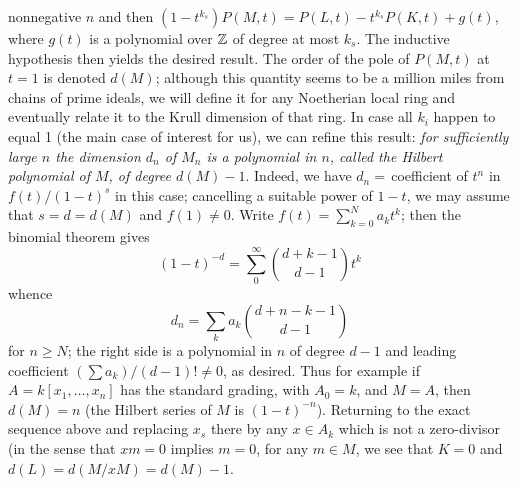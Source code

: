 \documentclass[10pt]{article}
\begin{document}
nonnegative $n$ and then $(1-t^{k_s})P(M,t) = P(L,t) - t^{k_s}P(K,t) +
g(t)$, where $g(t)$ is a polynomial over $\Bbb Z$ of degree at most
$k_s$. The inductive hypothesis then yields the desired result. The
order of the pole of $P(M,t)$ at $t=1$ is denoted $d(M)$; although this
quantity seems to be a million miles from chains of prime ideals, we
will define it for any Noetherian local ring and eventually relate it to
the Krull dimension of that ring. In case all $k_i$ happen to equal 1
(the main case of interest for us), we can refine this result: {\sl for
  sufficiently large $n$ the dimension $d_n$ of $M_n$ is a polynomial in
  $n$, called the Hilbert polynomial of $M$, of degree $d(M) - 1$}.
Indeed, we have $d_n =\,$coefficient of $t^n$ in $f(t)/(1-t)^s$ in this
case; cancelling a suitable power of $1-t$, we may assume that $s = d =
d(M)$ and $f(1)\ne0$. Write $f(t) = \sum_{k=0}^N a_k t^k$; then the
binomial theorem gives
$$(1-t)^{-d} = \sum_0^\infty {d+k-1\choose d-1} t^k$$
whence
$$ d_n = \sum_k a_k {d+n-k-1\choose d-1}$$
\noindent for $n\ge N$; the right side is a polynomial in $n$ of degree
$d-1$ and leading coefficient $(\sum a_k)/(d-1)!\ne0$, as desired. Thus
for example if $A=k[x_1,\ldots,x_n]$ has the standard grading, with $A_0
= k$, and $M=A$, then $d(M) = n$ (the Hilbert series of $M$ is
$(1-t)^{-n}$). Returning to the exact sequence above and replacing $x_s$
there by any $x\in A_k$ which is not a zero-divisor (in the sense that
$xm = 0$ implies $m=0$, for any $m\in M$, we see that $K=0$ and $d(L) =
d(M/xM) = d(M) - 1$.
\end{document}
